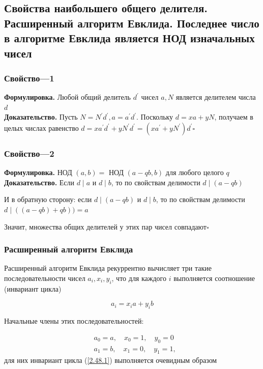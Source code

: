\documentclass[a4paper]{article}
\newcommand{\qed}{\hfill$\square$}
\begin{document}
\subsection{Свойства наибольшего общего делителя. Расширенный алгоритм Евклида. Последнее число в алгоритме Евклида является НОД изначальных чисел}
\subsubsection*{Свойство—1}
\textbf{Формулировка.} Любой общий делитель $d^{\prime}$ чисел $a, N$ является делителем числа $d$\\[2mm]
\indent\textbf{Доказательство.} Пусть $N=N^{\prime} d^{\prime}, a=a^{\prime} d^{\prime}$. Поскольку $d=x a+y N$, получаем в целых числах равенство $d=x a^{\prime} d^{\prime}+y N^{\prime} d^{\prime}=\left(x a^{\prime}+y N^{\prime}\right) d^{\prime}$\qed

\subsubsection*{Свойство—2}
\textbf{Формулировка.} НОД $(a, b)=$ НОД $(a-q b, b)$ для любого целого $q$\\[2mm]
\indent\textbf{Доказательство.} Если $d \mid a$ и $d \mid b$, то по свойствам делимости $d \mid(a-q b)$

И в обратную сторону: если $d \mid(a-q b)$ и $d \mid b$, то по свойствам делимости $d \mid((a-q b)+q b))=a$

Значит, множества общих делителей у этих пар чисел совпадают\qed

\subsubsection*{Расширенный алгоритм Евклида}
Расширенный алгоритм Евклида рекуррентно вычисляет три такие последовательности чисел $a_{i}, x_{i}, y_{i}$, что для каждого $i$ выполняется соотношение (инвариант цикла)


\begin{equation*}
a_{i}=x_{i} a+y_{i} b \tag{2.48.1}\label{2.48.1}
\end{equation*}

Начальные члены этих последовательностей:

$$
\begin{aligned}
& a_{0}=a, \quad x_{0}=1, \quad y_{0}=0 \\
& a_{1}=b, \quad x_{1}=0, \quad y_{1}=1,
\end{aligned}$$
для них инвариант цикла (\ref{2.48.1}) выполняется очевидным образом
\end{document}
